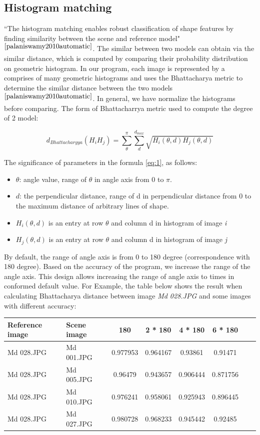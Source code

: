 \subsection{Histogram matching}
``The histogram matching enables robust classification of shape features by finding similarity between the scene and reference model"$^{\cite{palaniswamy2010automatic}}$. The similar between two models can obtain via the similar distance, which is computed by comparing their probability distribution on geometric histogram. In our program, each image is represented by a comprises of many geometric histograms and uses the Bhattacharya metric to determine the similar distance between the two models $^{\cite{palaniswamy2010automatic}}$. In general, we have normalize the histograms before comparing. The form of Bhattacharrya metric used to compute the degree of 2 model:
\begin{center}
\begin{equation} \label{eq:1}
d_{Bhattacharyya} (H_{i}H_{j}) = \sum\limits_{\theta}^{\pi}\sum\limits_{d}^{d_{max}}\sqrt{H_{i}(\theta,d)H_{j}(\theta,d)}
\end{equation}
\end{center}
The significance of parameters in the formula \ref{eq:1}, as follows:
\begin{itemize}
\item $\theta$: angle value, range of $\theta$ in angle axis from 0 to $\pi$.
\item $d$: the perpendicular distance, range of d in perpendicular distance from 0 to the maximum distance of arbitrary lines of shape.
\item $H_{i}(\theta,d)$ is an entry at row $\theta$ and column d in histogram of image \textit{i}
\item $H_{j}(\theta,d)$ is an entry at row $\theta$ and column d in histogram of image \textit{j}
\end{itemize}
By default, the range of angle axis is from 0 to 180 degree (correspondence with 180 degree). Based on the accuracy of the program, we increase the range of the angle axis. This design allows increasing the range of angle axis to times in conformed default value. For Example, the table below shows the result when calculating Bhattacharya distance between image \textit{Md 028.JPG} and some images with different accuracy:
\begin{center}
\begin{tabular}{|l|l|c|c|c|c|c|c|}
\hline
Reference image & Scene image & 180 & 2 * 180 & 4 * 180 & 6 * 180 \\ \hline
Md 028.JPG & Md 001.JPG & 0.977953 & 0.964167 & 0.93861 & 0.91471 \\ \hline
Md 028.JPG & Md 005.JPG & 0.96479 & 0.943657 & 0.906444 & 0.871756  \\ \hline
Md 028.JPG & Md 010.JPG & 0.976241 & 0.958061 & 0.925943 & 0.896445 \\ \hline
Md 028.JPG & Md 027.JPG & 0.980728 & 0.968233 & 0.945442 & 0.92485 \\ \hline
\end{tabular}
\end{center}
